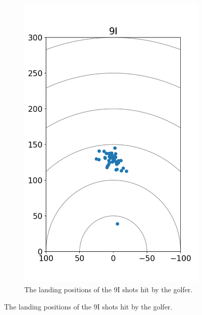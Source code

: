 \documentclass{kththesis}
\begin{document}
\begin{figure}
\begin{subfigure}{0.4\textwidth}
    \includegraphics[height=0.4\textheight]{Shots/9I_shots.png} 
    \caption{The landing positions of the 9I shots hit by the golfer.}
    \label{fig:9I_shots}
    \end{subfigure}
\end{figure}
\end{document}
